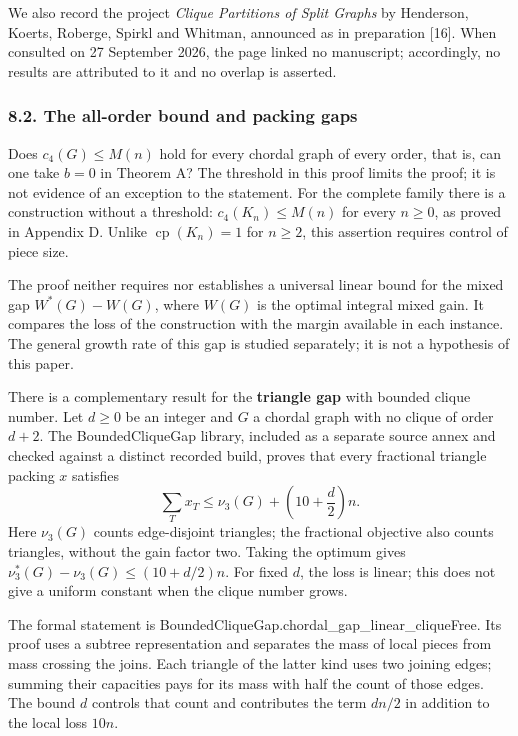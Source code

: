 \documentclass[english,11pt,a4paper]{article}
\begin{document}
We also record the project \emph{Clique Partitions of Split Graphs} by Henderson, Koerts, Roberge, Spirkl and Whitman, announced as in preparation {[}16{]}. When consulted on 27 September 2026, the page linked no manuscript; accordingly, no results are attributed to it and no overlap is asserted.

\subsubsection{8.2. The all-order bound and packing gaps}\label{the-all-order-bound-and-packing-gaps}

Does \(c_4(G)\le M(n)\) hold for every chordal graph of every order, that is, can one take \(b=0\) in Theorem A? The threshold in this proof limits the proof; it is not evidence of an exception to the statement. For the complete family there is a construction without a threshold: \(c_4(K_n)\le M(n)\) for every \(n\ge0\), as proved in Appendix D. Unlike \(\operatorname{cp}(K_n)=1\) for \(n\ge2\), this assertion requires control of piece size.

The proof neither requires nor establishes a universal linear bound for the mixed gap \(W^*(G)-W(G)\), where \(W(G)\) is the optimal integral mixed gain. It compares the loss of the construction with the margin available in each instance. The general growth rate of this gap is studied separately; it is not a hypothesis of this paper.

There is a complementary result for the \textbf{triangle gap} with bounded clique number. Let \(d\ge0\) be an integer and \(G\) a chordal graph with no clique of order \(d+2\). The {\ttfamily\small BoundedCliqu\discretionary{\hbox{\ensuremath{\hookrightarrow}}}{}{}eGap} library, included as a separate source annex and checked against a distinct recorded build, proves that every fractional triangle packing \(x\) satisfies \[
\sum_T x_T\le \nu_3(G)+\left(10+\frac d2\right)n.
\tag{8.1a}
\] Here \(\nu_3(G)\) counts edge-disjoint triangles; the fractional objective also counts triangles, without the gain factor two. Taking the optimum gives \(\nu_3^*(G)-\nu_3(G)\le(10+d/2)n\). For fixed \(d\), the loss is linear; this does not give a uniform constant when the clique number grows.

The formal statement is {\ttfamily\small BoundedCliqu\discretionary{\hbox{\ensuremath{\hookrightarrow}}}{}{}eGap.\discretionary{\hbox{\ensuremath{\hookrightarrow}}}{}{}chordal\_\discretionary{\hbox{\ensuremath{\hookrightarrow}}}{}{}gap\_\discretionary{\hbox{\ensuremath{\hookrightarrow}}}{}{}linear\_\discretionary{\hbox{\ensuremath{\hookrightarrow}}}{}{}cliqueFree}. Its proof uses a subtree representation and separates the mass of local pieces from mass crossing the joins. Each triangle of the latter kind uses two joining edges; summing their capacities pays for its mass with half the count of those edges. The bound \(d\) controls that count and contributes the term \(dn/2\) in addition to the local loss \(10n\).
\end{document}
